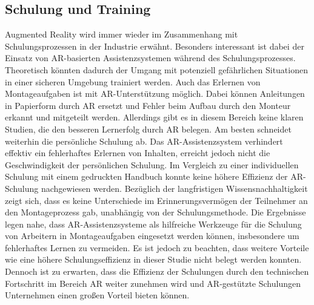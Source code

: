 \subsection{Schulung und Training}
Augmented Reality wird immer wieder im Zusammenhang mit Schulungsprozessen
in der Industrie erwähnt. Besonders interessant ist dabei der Einsatz von
AR-basierten Assistenzsystemen während des Schulungsprozesses. Theoretisch
könnten dadurch der Umgang mit potenziell gefährlichen Situationen in einer
sicheren Umgebung trainiert werden. Auch das Erlernen von Montageaufgaben ist
mit AR-Unterstützung möglich. Dabei können Anleitungen in Papierform durch AR
ersetzt und Fehler beim Aufbau durch den Monteur erkannt und mitgeteilt werden.
Allerdings gibt es in diesem Bereich keine klaren Studien, die den besseren
Lernerfolg durch AR belegen. Am besten schneidet weiterhin die persönliche
Schulung ab. Das AR-Assistenzsystem verhindert effektiv ein fehlerhaftes
Erlernen von Inhalten, erreicht jedoch nicht die Geschwindigkeit der
persönlichen Schulung. Im Vergleich zu einer individuellen Schulung mit einem
gedruckten Handbuch konnte keine höhere Effizienz der AR-Schulung nachgewiesen
werden. Bezüglich der langfristigen Wissensnachhaltigkeit zeigt sich, dass es
keine Unterschiede im Erinnerungsvermögen der Teilnehmer an den Montageprozess
gab, unabhängig von der Schulungsmethode. Die Ergebnisse legen nahe, dass
AR-Assistenzsysteme als hilfreiche Werkzeuge für die Schulung von Arbeitern in
Montageaufgaben eingesetzt werden können, insbesondere um fehlerhaftes Lernen
zu vermeiden. Es ist jedoch zu beachten, dass weitere Vorteile wie eine höhere
Schulungseffizienz in dieser Studie nicht belegt werden konnten. Dennoch ist zu
erwarten, dass die Effizienz der Schulungen durch den technischen Fortschritt
im Bereich AR weiter zunehmen wird und AR-gestützte Schulungen Unternehmen
einen großen Vorteil bieten können.